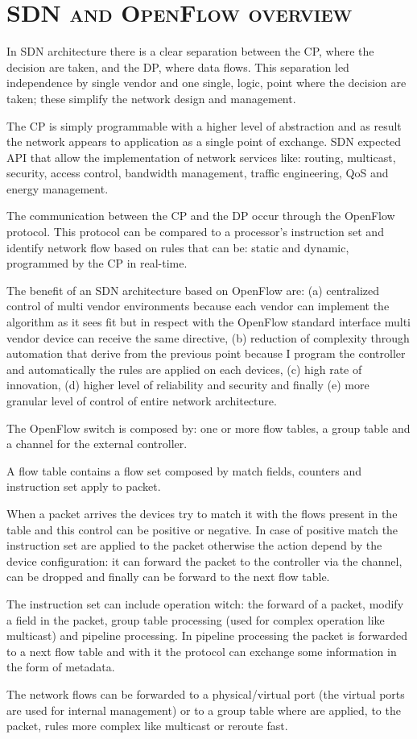 \section*{\small \textsc{\ac{SDN} and OpenFlow overview}}
In \ac{SDN} architecture there is a clear separation between the \ac{CP}, where the decision are taken, and the \ac{DP}, where data flows. This separation led independence by single vendor and one single, logic, point where the decision are taken; these simplify the network design and management.

The \ac{CP} is simply programmable with a higher level of abstraction and as result the network appears to application as a single point of exchange.
\ac{SDN} expected \ac{API} that allow the implementation of network services like: routing, multicast, security, access control, bandwidth management, traffic engineering, \ac{QoS} and energy management.

The communication between the \ac{CP} and the \ac{DP} occur through the OpenFlow protocol. This protocol can be compared to a processor's instruction set and identify network flow based on rules that can be: static and dynamic, programmed by the \ac{CP} in real-time.

The benefit of an \ac{SDN} architecture based on OpenFlow are: (a) centralized control of multi vendor environments because each vendor can implement the algorithm as it sees fit but in respect with the OpenFlow standard interface multi vendor device can receive the same directive, (b) reduction of complexity through automation that derive from the previous point because I program the controller and automatically the rules are applied on each devices, (c) high rate of innovation, (d) higher level of reliability and security and finally (e) more granular level of control of entire network architecture.

The OpenFlow switch is composed by: one or more flow tables, a group table and a channel for the external controller.

A flow table contains a flow set composed by match fields, counters and instruction set apply to packet.

When a packet arrives the devices try to match it with the flows present in the table and this control can be positive or negative. In case of positive match the instruction set are applied to the packet otherwise the action depend by the device configuration: it can forward the packet to the controller via the channel, can be dropped and finally can be forward to the next flow table.

The instruction set can include operation witch: the forward of a packet, modify a field in the packet, group table processing (used for complex operation like multicast) and pipeline processing. In pipeline processing the packet is forwarded to a next flow table and with it the protocol can exchange some information in the form of metadata.

The network flows can be forwarded to a physical/virtual port (the virtual ports are used for internal management) or to a group table where are applied, to the packet, rules more complex like multicast or reroute fast.